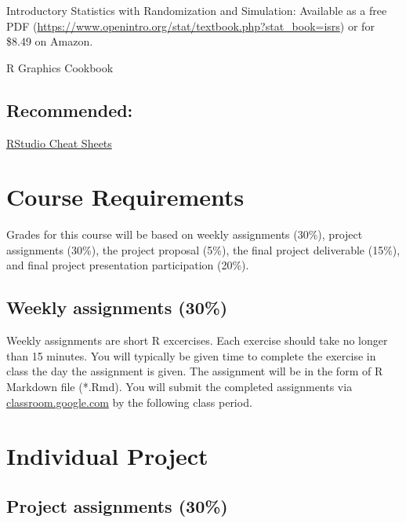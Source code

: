 \documentclass[]{book}
\theoremstyle{definition}
\theoremstyle{definition}
\theoremstyle{remark}
\begin{document}
Introductory Statistics with Randomization and Simulation: Available as
a free PDF
(\url{https://www.openintro.org/stat/textbook.php?stat_book=isrs}) or
for \$8.49 on Amazon.

R Graphics Cookbook

\subsection*{Recommended:}\label{recommended}

\href{https://www.rstudio.com/resources/cheatsheets/}{RStudio Cheat
Sheets}

\section*{Course Requirements}\label{course-requirements}

Grades for this course will be based on weekly assignments (30\%),
project assignments (30\%), the project proposal (5\%), the final
project deliverable (15\%), and final project presentation participation
(20\%).

\subsection*{Weekly assignments (30\%)}\label{weekly-assignments-30}

Weekly assignments are short R excercises. Each exercise should take no
longer than 15 minutes. You will typically be given time to complete the
exercise in class the day the assignment is given. The assignment will
be in the form of R Markdown file (*.Rmd). You will submit the completed
assignments via \href{https//classroom.google.com}{classroom.google.com}
by the following class period.

\section*{Individual Project}\label{individual-project}

\subsection*{Project assignments (30\%)}\label{project-assignments-30}
\end{document}
